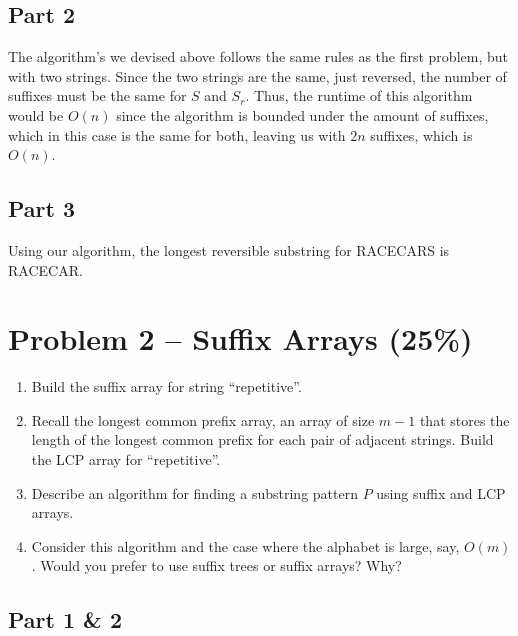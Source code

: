 \documentclass[12pt,letterpaper]{article}
\begin{document}
\subsection*{Part 2}

The algorithm's we devised above follows the same rules as the first problem, but with two strings. Since the two strings are the same, just reversed, the number of suffixes must be the same for $S$ and $S_r$. Thus, the runtime of this algorithm would be $O(n)$ since the algorithm is bounded under the amount of suffixes, which in this case is the same for both, leaving us with $2n$ suffixes, which is $O(n)$.

\subsection*{Part 3}

Using our algorithm, the longest reversible substring for RACECARS is RACECAR.

\newpage
\section*{Problem 2 -- Suffix Arrays (25\%)}
\begin{enumerate}
    \item Build the suffix array for string ``repetitive''.
    \item Recall the longest common prefix array, an array of size $m-1$ that stores the length of the longest common prefix for each pair of adjacent strings. 
Build the LCP array for ``repetitive''.
    \item Describe an algorithm for finding a substring pattern $P$ using suffix and LCP arrays.
    \item Consider this algorithm and the case where the alphabet is large, say, $O(m)$. Would you prefer to use suffix trees or suffix arrays? Why?
\end{enumerate}

\subsection*{Part 1 \& 2}
\end{document}
